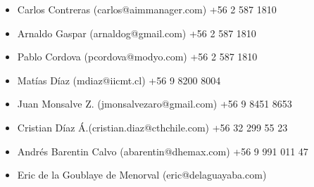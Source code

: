 \documentclass[11pt,letterpaper,sans]{moderncv}        %
\begin{document}
\vspace{6pt}

\begin{itemize}

\item{Carlos Contreras (carlos@aimmanager.com) +56 2 587 1810 }
\item{Arnaldo Gaspar (arnaldog@gmail.com) +56 2 587 1810 }
\item{Pablo Cordova (pcordova@modyo.com) +56 2 587 1810 }
\item{Matías Díaz (mdiaz@iicmt.cl) +56 9 8200 8004}
\item{Juan Monsalve Z. (jmonsalvezaro@gmail.com) +56 9 8451 8653 }
\item{Cristian Díaz Á.(cristian.diaz@cthchile.com) +56 32 299 55 23}
\item{Andrés Barentin Calvo (abarentin@dhemax.com) +56 9 991 011 47}
\item{Eric de la Goublaye de Menorval (eric@delaguayaba.com)}

\end{itemize}

\nocite{*}



\end{document}
